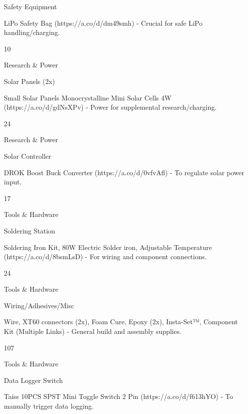 \documentclass[11pt,letterpaper]{article}
\begin{document}
Safety Equipment\par

LiPo Safety Bag (https://a.co/d/dm49smh) - Crucial for safe LiPo handling/charging.\par

10\par

Research \& Power\par

Solar Panels (2x)\par

Small Solar Panels Monocrystalline Mini Solar Cells 4W (https://a.co/d/gdNsXPv) - Power for supplemental research/charging.\par

24\par

Research \& Power\par

Solar Controller\par

DROK Boost Buck Converter (https://a.co/d/0vfvAfl) - To regulate solar power input.\par

17\par

Tools \& Hardware\par

Soldering Station\par

Soldering Iron Kit, 80W Electric Solder iron, Adjustable Temperature (https://a.co/d/8bsmLsD) - For wiring and component connections.\par

24\par

Tools \& Hardware\par

Wiring/Adhesives/Misc\par

Wire, XT60 connectors (2x), Foam Cure, Epoxy (2x), Insta-Set™, Component Kit (Multiple Links) - General build and assembly supplies.\par

107\par

Tools \& Hardware\par

Data Logger Switch\par

Taiss 10PCS SPST Mini Toggle Switch 2 Pin (https://a.co/d/f613hYO) - To manually trigger data logging.\par
\end{document}
